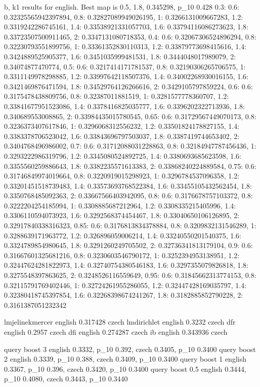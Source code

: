 \documentclass[a4paper]{article}
\begin{document}
b, k1 results for english. Best map is 0.5, 1.8, 0.345298, p_10 0.428
{0.3: {0.6: 0.32325565942397894, 0.8: 0.32827089949026195, 1: 0.3266131009667283, 1.2: 0.3319242286745161, 1.4: 0.33538921331057703, 1.6: 0.33794116086273623, 1.8: 0.33723507500911465, 2: 0.3347131080718353}, 0.4: {0.6: 0.32067306524896294, 0.8: 0.32230793551899756, 1: 0.33361352830110313, 1.2: 0.33879773698415616, 1.4: 0.3424889525905377, 1.6: 0.3451035999481531, 1.8: 0.3444048017989079, 2: 0.34074877470774}, 0.5: {0.6: 0.3217414171781537, 0.8: 0.32190306265706575, 1: 0.3311149978298885, 1.2: 0.33997642118507376, 1.4: 0.34002268930016155, 1.6: 0.3421469876471594, 1.8: 0.34529764126266616, 2: 0.3429105797859224}, 0.6: {0.6: 0.3175478438809756, 0.8: 0.32387011881519, 1: 0.3281577778360707, 1.2: 0.33841677951523086, 1.4: 0.3378416825035777, 1.6: 0.3396202322713936, 1.8: 0.340689553008865, 2: 0.33984435015780545}, 0.65: {0.6: 0.31729567449070173, 0.8: 0.3236373407617846, 1: 0.3296068312556232, 1.2: 0.33501824178827155, 1.4: 0.3383378706523042, 1.6: 0.33843696797503037, 1.8: 0.3387419744653402, 2: 0.3404768496986002}, 0.7: {0.6: 0.31712088031228863, 0.8: 0.32184947787456436, 1: 0.3293222986319796, 1.2: 0.3345080524892725, 1.4: 0.3380693685623598, 1.6: 0.3355560259886643, 1.8: 0.3382235571613383, 2: 0.33868240224889584}, 0.75: {0.6: 0.31746849974019664, 0.8: 0.3220919015298923, 1: 0.3296784537096358, 1.2: 0.33201451518739483, 1.4: 0.33573693768522384, 1.6: 0.33455105432562454, 1.8: 0.3350768485092363, 2: 0.33667566403942095}, 0.8: {0.6: 0.3176678757103372, 0.8: 0.3222204254185994, 1: 0.3308885687212964, 1.2: 0.3308335215405996, 1.4: 0.3306110594073923, 1.6: 0.3292568374454467, 1.8: 0.33040650106126895, 2: 0.32917840338316323}, 0.85: {0.6: 0.3176813834378884, 0.8: 0.3209832131546289, 1: 0.3288639171963772, 1.2: 0.326896059006214, 1.4: 0.33240550201540375, 1.6: 0.3324789854980645, 1.8: 0.3291260249705502, 2: 0.32736341813179104}, 0.9: {0.6: 0.31667601325681216, 0.8: 0.3230603546790172, 1: 0.3252394953138951, 1.2: 0.32447624281822973, 1.4: 0.32740754380546183, 1.6: 0.3297355079826818, 1.8: 0.3275548397863625, 2: 0.3248526116559649}, 0.95: {0.6: 0.31845662313774153, 0.8: 0.32115791769402446, 1: 0.32724261955286055, 1.2: 0.32447428169035797, 1.4: 0.32380418745397854, 1.6: 0.32268398674241267, 1.8: 0.3182885852790228, 2: 0.3161387051232342}}

lmjelinekmercer english 0.317428 czech 
lmdirichlet english 0.3232 czech 
dfr english 0.2957 czech 
dfi english 0.274287 czech 
ib english 0.343936 czech 

query boost 3 english 0.3332, p_10 0.392, czech 0.3405, p_10 0.3400
query boost 2 english 0.3339, p_10 0.388, czech 0.3409, p_10 0.3400
query boost 1 english 0.3367, p_10 0.396, czech 0.3420, p_10 0.3400
query boost 0.5 english 0.3444, p_10 0.4080, czech 0.3443, p_10 0.3440
\end{document}
